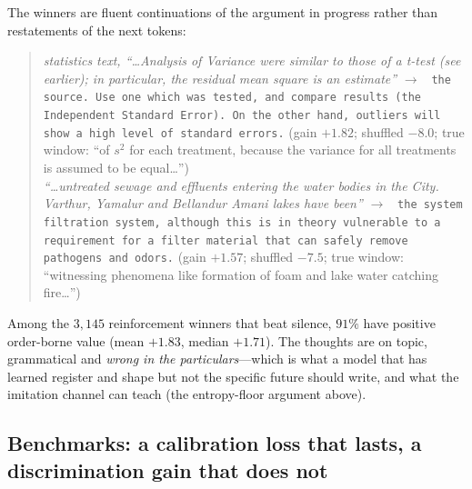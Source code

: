 \documentclass{article} %
\begin{document}
The winners are fluent continuations of the argument in progress rather than restatements of the next tokens:
\begin{quote}\small
\emph{statistics text, ``\ldots Analysis of Variance were similar to those of a t-test (see earlier); in particular, the residual mean square is an estimate''} $\to$ \texttt{ the source. Use one which was tested, and compare results (the Independent Standard Error). On the other hand, outliers will show a high level of standard errors.} \quad (gain $+1.82$; shuffled $-8.0$; true window: ``of $s^2$ for each treatment, because the variance for all treatments is assumed to be equal\ldots'')\\[2pt]
\emph{``\ldots untreated sewage and effluents entering the water bodies in the City. Varthur, Yamalur and Bellandur Amani lakes have been''} $\to$ \texttt{ the system filtration system, although this is in theory vulnerable to a requirement for a filter material that can safely remove pathogens and odors.} \quad (gain $+1.57$; shuffled $-7.5$; true window: ``witnessing phenomena like formation of foam and lake water catching fire\ldots'')
\end{quote}
Among the $3{,}145$ reinforcement winners that beat silence, $91\%$ have positive order-borne value (mean $+1.83$, median $+1.71$). The thoughts are on topic, grammatical and \emph{wrong in the particulars}---which is what a model that has learned register and shape but not the specific future should write, and what the imitation channel can teach (the entropy-floor argument above).

\subsection{Benchmarks: a calibration loss that lasts, a discrimination gain that does not}
\label{sec:bench}
\end{document}

